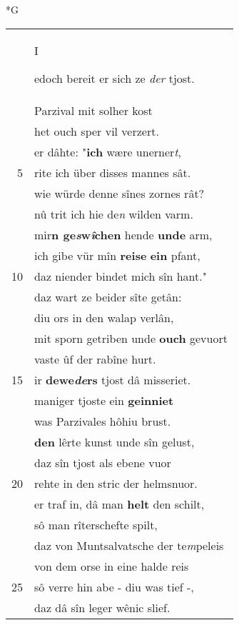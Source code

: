 \documentclass[8pt,a4paper,notitlepage]{article}
\begin{document}
\newpage
\begin{table}[ht]
\begin{minipage}[t]{0.5\linewidth}
\small
\begin{center}*G
\end{center}
\begin{tabular}{rl}
 & \begin{large}I\end{large}edoch bereit er sich ze \textit{der} tjost.\\ 
 & Parzival mit solher kost\\ 
 & het ouch sper vil verzert.\\ 
 & er dâhte: "\textbf{ich} wære unerner\textit{t},\\ 
5 & rite ich über disses mannes sât.\\ 
 & wie würde denne sînes zornes rât?\\ 
 & nû trit ich hie de\textit{n} wilden varm.\\ 
 & mir\textbf{n ge\textit{s}w\textit{î}chen} hende \textbf{unde} arm,\\ 
 & ich gibe vür mîn \textbf{reise} \textbf{ein} pfant,\\ 
10 & daz niender bindet mich sîn hant."\\ 
 & daz wart ze beider sîte getân:\\ 
 & diu ors in den walap verlân,\\ 
 & mit sporn getriben unde \textbf{ouch} gevuort\\ 
 & vaste ûf der rabîne hurt.\\ 
15 & ir \textbf{dewe\textit{de}rs} tjost dâ misseriet.\\ 
 & maniger tjoste ein \textbf{geinniet}\\ 
 & was Parzivales hôhiu brust.\\ 
 & \textbf{den} lêrte kunst unde sîn gelust,\\ 
 & daz sîn tjost als ebene vuor\\ 
20 & rehte in den stric der helmsnuor.\\ 
 & er traf in, dâ man \textbf{helt} den schilt,\\ 
 & sô man rîterschefte spilt,\\ 
 & daz von Muntsalvatsche der te\textit{m}peleis\\ 
 & von dem orse in eine halde reis\\ 
25 & sô verre hin abe - diu was tief -,\\ 
 & daz dâ sîn leger wênic slief.\\ 

\end{tabular}
\end{minipage}
\end{table}
\end{document}
